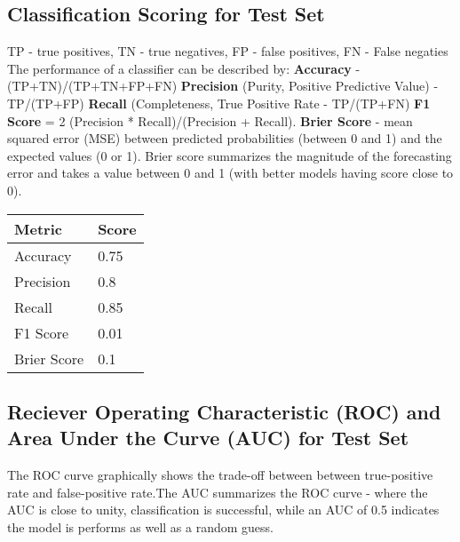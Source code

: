 \documentclass{article}%
\begin{document}
\subsection*{Classification Scoring for Test Set}%
\label{subsec:ClassificationScoringforTestSet}%
TP {-} true positives, TN {-} true negatives, FP {-} false positives, FN {-} False negaties \newline%
\newline%
%
The performance of a classifier can be described by:\newline%
%
\textbf{Accuracy }%
 {-} (TP+TN)/(TP+TN+FP+FN) \newline%
%
\textbf{Precision }%
 (Purity, Positive Predictive Value) {-} TP/(TP+FP) \newline%
%
\textbf{Recall }%
 (Completeness, True Positive Rate {-} TP/(TP+FN) \newline%
\textbf{F1 Score }%
 = 2 (Precision * Recall)/(Precision + Recall).\newline%
%
\textbf{Brier Score }%
 {-} mean squared error (MSE) between predicted probabilities (between 0 and 1) and the expected values (0 or 1). Brier score summarizes the magnitude of the forecasting error and takes a value between 0 and 1 (with better models having score close to 0).\newline%
\newline%
%
\begin{tabular}{|l|l|}%
\hline%
\textbf{Metric}&\textbf{Score}\\%
\hline%
Accuracy&0.75\\%
Precision&0.8\\%
Recall&0.85\\%
F1 Score&0.01\\%
Brier Score&0.1\\%
\hline%
\end{tabular}%
\newline%
\newline%

%
\subsection*{Reciever Operating Characteristic (ROC) and Area Under the Curve (AUC) for Test Set}%
\label{subsec:RecieverOperatingCharacteristic(ROC)andAreaUndertheCurve(AUC)forTestSet}%
The ROC curve graphically shows the trade{-}off between between true{-}positive rate and false{-}positive rate.The AUC summarizes the ROC curve {-} where the AUC is close to unity, classification is successful, while an AUC of 0.5 indicates the model is performs as well as a random guess.%
\end{document}

